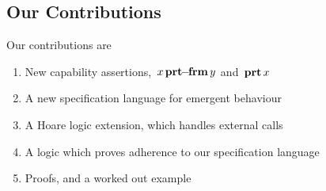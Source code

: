  

\subsection{Our Contributions}

Our contributions are

\begin{enumerate}
\item
New capability assertions, ${\, x\, \mathbf{prt\!\!-\!\!frm}\, y}$  and ${\, \mathbf{prt}\, x\, }$ 
\item
A new specification language for emergent behaviour  
\item
A Hoare logic extension, which handles external calls
\item
A logic which proves adherence to our specification language
\item
Proofs, and a worked out example
\end{enumerate}

 
